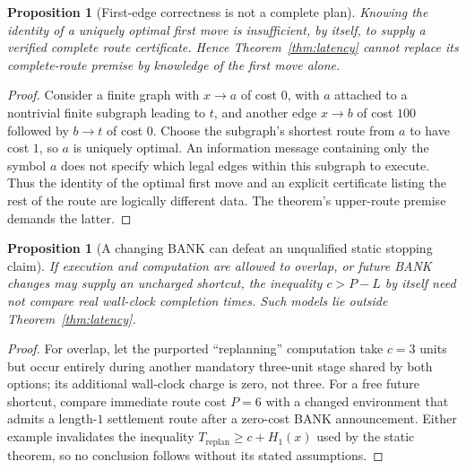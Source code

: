 \documentclass[11pt]{article}
\newtheorem{proposition}[theorem]{Proposition}
\theoremstyle{definition}\newtheorem{definition}[theorem]{Definition}\newtheorem{assumption}[theorem]{Assumption}
\theoremstyle{remark}\newtheorem{remark}[theorem]{Remark}
\begin{document}
\begin{proposition}[First-edge correctness is not a complete plan]
Knowing the identity of a uniquely optimal first move is insufficient, by itself, to supply a verified complete route certificate. Hence Theorem~\ref{thm:latency} cannot replace its complete-route premise by knowledge of the first move alone.
\end{proposition}
\begin{proof}
Consider a finite graph with $x\to a$ of cost $0$, with $a$ attached to a nontrivial finite subgraph leading to $t$, and another edge $x\to b$ of cost $100$ followed by $b\to t$ of cost $0$. Choose the subgraph's shortest route from $a$ to have cost $1$, so $a$ is uniquely optimal. An information message containing only the symbol $a$ does not specify which legal edges within this subgraph to execute. Thus the identity of the optimal first move and an explicit certificate listing the rest of the route are logically different data. The theorem's upper-route premise demands the latter.
\end{proof}
\par


\begin{proposition}[A changing BANK can defeat an unqualified static stopping claim]
If execution and computation are allowed to overlap, or future BANK changes may supply an uncharged shortcut, the inequality $c>P-L$ by itself need not compare real wall-clock completion times. Such models lie outside Theorem~\ref{thm:latency}.
\end{proposition}
\begin{proof}
For overlap, let the purported ``replanning'' computation take $c=3$ units but occur entirely during another mandatory three-unit stage shared by both options; its additional wall-clock charge is zero, not three. For a free future shortcut, compare immediate route cost $P=6$ with a changed environment that admits a length-$1$ settlement route after a zero-cost BANK announcement. Either example invalidates the inequality $T_{\mathrm{replan}}\geq c+H_1(x)$ used by the static theorem, so no conclusion follows without its stated assumptions.
\end{proof}
\par
\end{document}
